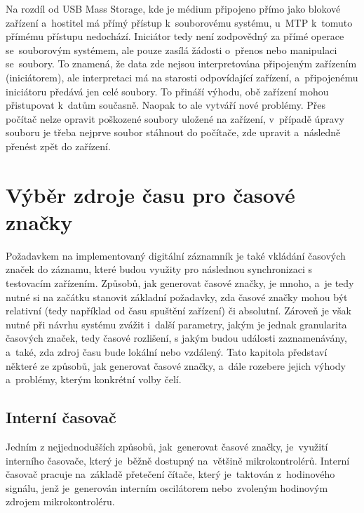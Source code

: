 Na rozdíl od USB Mass Storage, kde je médium připojeno přímo jako blokové zařízení a~hostitel má přímý přístup k~souborovému systému, u~MTP k~tomuto přímému přístupu nedochází. Iniciátor tedy není zodpovědný za přímé operace se~souborovým systémem, ale pouze zasílá žádosti o~přenos nebo manipulaci se~soubory. To znamená, že data zde nejsou interpretována připojeným zařízením (iniciátorem), ale interpretaci má na starosti odpovídající zařízení, a~připojenému iniciátoru předává jen celé soubory. To přináší výhodu, obě zařízení mohou přistupovat k~datům současně. Naopak to ale vytváří nové problémy. Přes počítač nelze opravit poškozené soubory uložené na zařízení, v~případě úpravy souboru je třeba nejprve soubor stáhnout do počítače, zde upravit a~následně přenést zpět do zařízení.~\cite{usb_standard_mtp}

\section{Výběr zdroje času pro časové značky}
\label{zdroje_casu}
Požadavkem na implementovaný digitální záznamník je také vkládání časových značek do záznamu, které budou využity pro následnou synchronizaci s testovacím zařízením. Způsobů, jak generovat časové značky, je mnoho, a~je tedy nutné si na začátku stanovit základní požadavky, zda časové značky mohou být relativní (tedy například od času spuštění zařízení) či absolutní. Zároveň je však nutné při návrhu systému zvážit i~další parametry, jakým je jednak granularita časových značek, tedy časové rozlišení, s jakým budou události zaznamenávány, a~také, zda zdroj času bude lokální nebo vzdálený. Tato kapitola představí některé ze způsobů, jak generovat časové značky, a~dále rozebere jejich výhody a~problémy, kterým konkrétní volby čelí.~\cite{perny2008zarizeni_cas_znacky}

\subsection{Interní časovač}
Jedním z nejjednodušších způsobů, jak~generovat časové značky, je~využití interního časovače, který je~běžně dostupný na~většině mikrokontrolérů. Interní časovač pracuje na~základě přetečení čítače, který je~taktován z~hodinového signálu, jenž je~generován interním oscilátorem nebo~zvoleným hodinovým zdrojem mikrokontroléru.~\cite{nxp_KL05_Reference_Manual}

